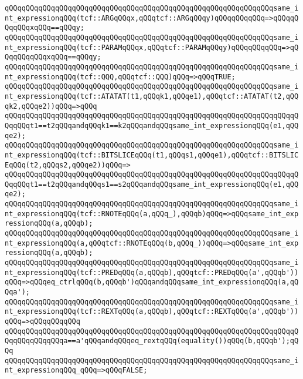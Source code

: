 \verb|qQQqqQQqqQQqqQQqqQQqqQQqqQQqqQQqqQQqqQQqqQQqqQQqqQQqqQQqqQQqqQQqsame_int_expressionqQQq(tcf::ARGqQQqx,qQQqtcf::ARGqQQqy)qQQqqQQqqQQq=>qQQqqQQqqQQqxqQQq==qQQqy;|\newline
\verb|qQQqqQQqqQQqqQQqqQQqqQQqqQQqqQQqqQQqqQQqqQQqqQQqqQQqqQQqqQQqqQQqsame_int_expressionqQQq(tcf::PARAMqQQqx,qQQqtcf::PARAMqQQqy)qQQqqQQqqQQq=>qQQqqQQqqQQqxqQQq==qQQqy;|\newline
\verb|qQQqqQQqqQQqqQQqqQQqqQQqqQQqqQQqqQQqqQQqqQQqqQQqqQQqqQQqqQQqqQQqsame_int_expressionqQQq(tcf::QQQ,qQQqtcf::QQQ)qQQq=>qQQqTRUE;|\newline
\verb|qQQqqQQqqQQqqQQqqQQqqQQqqQQqqQQqqQQqqQQqqQQqqQQqqQQqqQQqqQQqqQQqsame_int_expressionqQQq(tcf::ATATAT(t1,qQQqk1,qQQqe1),qQQqtcf::ATATAT(t2,qQQqk2,qQQqe2))qQQq=>qQQq|\newline
\verb|qQQqqQQqqQQqqQQqqQQqqQQqqQQqqQQqqQQqqQQqqQQqqQQqqQQqqQQqqQQqqQQqqQQqqQQqqQQqt1==t2qQQqandqQQqk1==k2qQQqandqQQqsame_int_expressionqQQq(e1,qQQqe2);|\newline
\verb|qQQqqQQqqQQqqQQqqQQqqQQqqQQqqQQqqQQqqQQqqQQqqQQqqQQqqQQqqQQqqQQqsame_int_expressionqQQq(tcf::BITSLICEqQQq(t1,qQQqs1,qQQqe1),qQQqtcf::BITSLICEqQQq(t2,qQQqs2,qQQqe2))qQQq=>|\newline
\verb|qQQqqQQqqQQqqQQqqQQqqQQqqQQqqQQqqQQqqQQqqQQqqQQqqQQqqQQqqQQqqQQqqQQqqQQqqQQqt1==t2qQQqandqQQqs1==s2qQQqandqQQqsame_int_expressionqQQq(e1,qQQqe2);|\newline
\verb|qQQqqQQqqQQqqQQqqQQqqQQqqQQqqQQqqQQqqQQqqQQqqQQqqQQqqQQqqQQqqQQqsame_int_expressionqQQq(tcf::RNOTEqQQq(a,qQQq_),qQQqb)qQQq=>qQQqsame_int_expressionqQQq(a,qQQqb);|\newline
\verb|qQQqqQQqqQQqqQQqqQQqqQQqqQQqqQQqqQQqqQQqqQQqqQQqqQQqqQQqqQQqqQQqsame_int_expressionqQQq(a,qQQqtcf::RNOTEqQQq(b,qQQq_))qQQq=>qQQqsame_int_expressionqQQq(a,qQQqb);|\newline
\verb|qQQqqQQqqQQqqQQqqQQqqQQqqQQqqQQqqQQqqQQqqQQqqQQqqQQqqQQqqQQqqQQqsame_int_expressionqQQq(tcf::PREDqQQq(a,qQQqb),qQQqtcf::PREDqQQq(a',qQQqb'))qQQq=>qQQqeq_ctrlqQQq(b,qQQqb')qQQqandqQQqsame_int_expressionqQQq(a,qQQqa');|\newline
\verb|qQQqqQQqqQQqqQQqqQQqqQQqqQQqqQQqqQQqqQQqqQQqqQQqqQQqqQQqqQQqqQQqsame_int_expressionqQQq(tcf::REXTqQQq(a,qQQqb),qQQqtcf::REXTqQQq(a',qQQqb'))qQQq=>qQQqqQQqqQQq|\newline
\verb|qQQqqQQqqQQqqQQqqQQqqQQqqQQqqQQqqQQqqQQqqQQqqQQqqQQqqQQqqQQqqQQqqQQqqQQqqQQqqQQqqQQqa==a'qQQqandqQQqeq_rextqQQq(equality())qQQq(b,qQQqb');qQQq|\newline
\verb|qQQqqQQqqQQqqQQqqQQqqQQqqQQqqQQqqQQqqQQqqQQqqQQqqQQqqQQqqQQqqQQqsame_int_expressionqQQq_qQQq=>qQQqFALSE;|\newline
